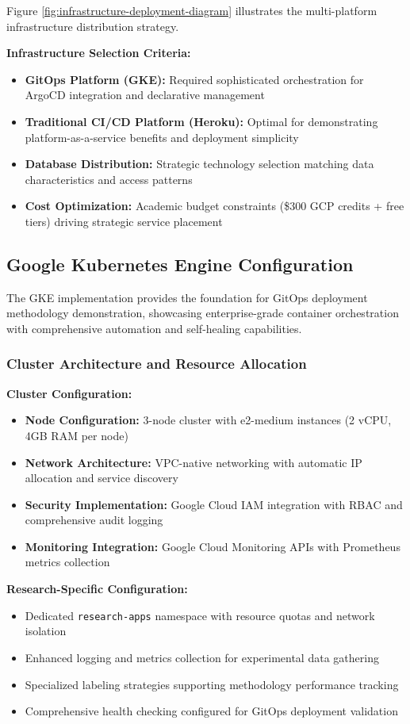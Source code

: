 Figure \ref{fig:infrastructure-deployment-diagram} illustrates the multi-platform infrastructure distribution strategy.

\textbf{Infrastructure Selection Criteria:}
\begin{itemize}
\item \textbf{GitOps Platform (GKE):} Required sophisticated orchestration for ArgoCD integration and declarative management
\item \textbf{Traditional CI/CD Platform (Heroku):} Optimal for demonstrating platform-as-a-service benefits and deployment simplicity
\item \textbf{Database Distribution:} Strategic technology selection matching data characteristics and access patterns
\item \textbf{Cost Optimization:} Academic budget constraints (\$300 GCP credits + free tiers) driving strategic service placement
\end{itemize}

\subsection{Google Kubernetes Engine Configuration}

The GKE implementation provides the foundation for GitOps deployment methodology demonstration, showcasing enterprise-grade container orchestration with comprehensive automation and self-healing capabilities.

\subsubsection{Cluster Architecture and Resource Allocation}

\textbf{Cluster Configuration:}
\begin{itemize}
\item \textbf{Node Configuration:} 3-node cluster with e2-medium instances (2 vCPU, 4GB RAM per node)
\item \textbf{Network Architecture:} VPC-native networking with automatic IP allocation and service discovery
\item \textbf{Security Implementation:} Google Cloud IAM integration with RBAC and comprehensive audit logging
\item \textbf{Monitoring Integration:} Google Cloud Monitoring APIs with Prometheus metrics collection
\end{itemize}

\textbf{Research-Specific Configuration:}
\begin{itemize}
\item Dedicated \texttt{research-apps} namespace with resource quotas and network isolation
\item Enhanced logging and metrics collection for experimental data gathering
\item Specialized labeling strategies supporting methodology performance tracking
\item Comprehensive health checking configured for GitOps deployment validation
\end{itemize}

